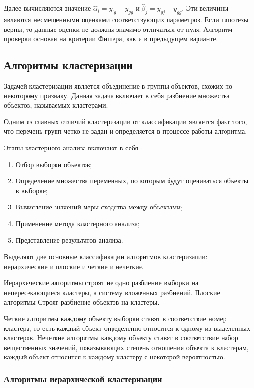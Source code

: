 Далее вычисляются значение $\widehat{\alpha}_i = y_{ig}-y_{gg}$ и $\widehat{\beta}_j=y_{gj}-y_{gg}$. Эти величины являются несмещенными оценками соответствующих параметров. Если гипотезы верны, то данные оценки не должны значимо отличаться от нуля. Алгоритм проверки основан на критерии Фишера, как и в предыдущем варианте. \cite{disperMethod}

\subsection{Алгоритмы кластеризации}
Задачей кластеризации является объединение в группы объектов, схожих по некоторому признаку. Данная задача включает в себя разбиение множества объектов, называемых кластерами. \cite{clasters}

Одним из главных отличий кластеризации от классификации является факт того, что перечень групп четко не задан и определяется в процессе работы алгоритма. \cite{clasters}

Этапы кластерного анализа включают в себя \cite{clasters}:

\begin{enumerate}[leftmargin=1.6\parindent]
\item Отбор выборки объектов;
\item Определение множества переменных, по которым будут оцениваться объекты в выборке;
\item Вычисление значений меры сходства между объектами;
\item Применение метода кластерного анализа;
\item Представление результатов анализа.
\end{enumerate}

Выделяют две основные классификации алгоритмов кластеризации: иерархические и плоские и четкие и нечеткие. \cite{clasters}

Иерархические алгоритмы строят не одно разбиение выборки на непересекающиеся кластеры, а систему вложенных разбиений. Плоские алгоритмы Строят разбиение объектов на кластеры. \cite{clasters}

Четкие алгоритмы каждому объекту выборки ставят в соответствие номер кластера, то есть каждый объект определенно относится к одному из выделенных кластеров. Нечеткие алгоритмы каждому объекту ставят в соответствие набор вещественных значений, показывающих степень отношения объекта к кластерам, каждый объект относится к каждому кластеру с некоторой вероятностью. \cite{clasters}

\subsubsection{Алгоритмы иерархической кластеризации}

